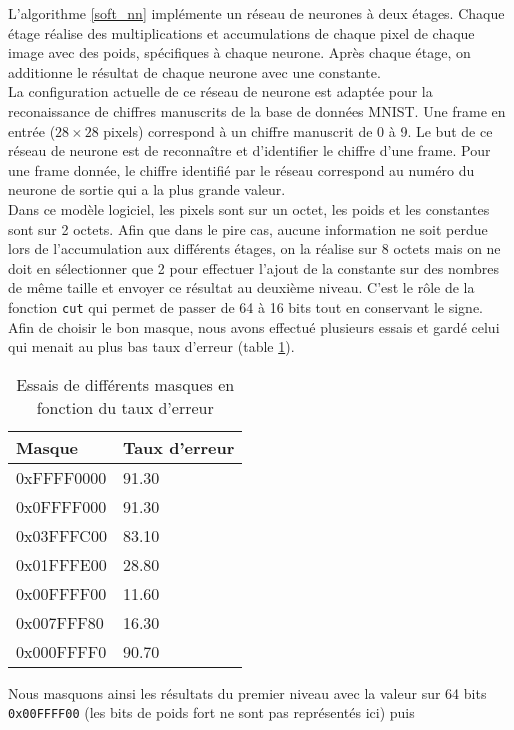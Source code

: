 L'algorithme \ref{soft_nn} implémente un réseau de neurones à deux étages.
Chaque étage réalise des multiplications et accumulations de chaque pixel de
chaque image avec des poids, spécifiques à chaque neurone. Après chaque étage,
on additionne le résultat de chaque neurone avec une constante. \\
La configuration actuelle de ce réseau de neurone est adaptée pour la
reconaissance de chiffres manuscrits de la base de données MNIST. Une frame
en entrée ($28 \times 28$ pixels) correspond à un chiffre manuscrit de 0 à 9.
Le but de ce réseau de neurone est de reconnaître et d'identifier le chiffre
d'une frame. Pour une frame donnée, le chiffre identifié par le réseau correspond
au numéro du neurone de sortie qui a la plus grande valeur. \\
Dans ce modèle logiciel, les pixels sont sur un octet, les poids et les
constantes sont sur 2 octets. Afin que dans le pire cas, aucune information ne
soit perdue lors de l'accumulation aux différents étages, on la réalise sur
8 octets mais on ne doit en sélectionner que 2 pour effectuer l'ajout de la constante
sur des nombres de même taille et envoyer ce résultat au deuxième niveau. C'est
le rôle de la fonction \texttt{cut} qui permet de passer de 64 à 16 bits tout
en conservant le signe. Afin de choisir le bon masque, nous avons effectué
plusieurs essais et gardé celui qui menait au plus bas taux d'erreur (table
\ref{masques}). \\
\begin{table}[h!]
\centering
    \begin{tabular}{| l | l |}
    \hline
    Masque & Taux d'erreur \\ \hline
    0xFFFF0000 & 91.30 \\ \hline
    0x0FFFF000 & 91.30 \\ \hline
    0x03FFFC00 & 83.10 \\ \hline
    0x01FFFE00 & 28.80 \\ \hline
    0x00FFFF00 & 11.60 \\ \hline
    0x007FFF80 & 16.30 \\ \hline
    0x000FFFF0 & 90.70 \\ \hline
    \end{tabular}
    \caption{Essais de différents masques en fonction du taux d'erreur}
    \label{masques}
\end{table}
Nous masquons ainsi les résultats du premier niveau avec la valeur sur 64 bits
\texttt{0x00FFFF00} (les bits de poids fort ne sont pas représentés ici) puis
